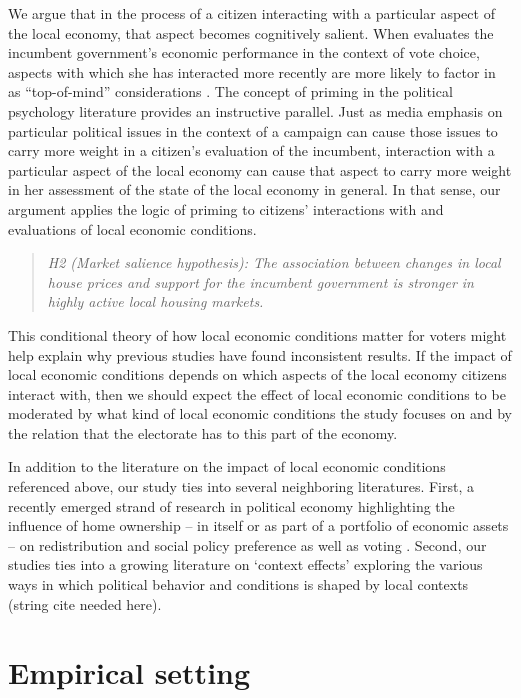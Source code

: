 \documentclass[12pt,a4paper]{article}
\begin{document}
	We argue that in the process of a citizen interacting with a particular aspect of the local economy, that aspect becomes cognitively salient. When evaluates the incumbent government’s economic performance in the context of vote choice, aspects with which she has interacted more recently are more likely to factor in as “top-of-mind” considerations \cite{zaller1992nature}. The concept of priming in the political psychology literature provides an instructive parallel. Just as media emphasis on particular political issues in the context of a campaign can cause those issues to carry more weight in a citizen’s evaluation of the incumbent, interaction with a particular aspect of the local economy can cause that aspect to carry more weight in her assessment of the state of the local economy in general. In that sense, our argument applies the logic of priming to citizens’ interactions with and evaluations of local economic conditions.
	
	\begin{quote}
	\textit{H2 (Market salience hypothesis): The association between changes in local house prices and support for the incumbent government is stronger in highly active local housing markets.}
	\end{quote}
	
	This conditional theory of how local economic conditions matter for voters might help explain why previous studies have found inconsistent results. If the impact of local economic conditions depends on which aspects of the local economy citizens interact with, then we should expect the effect of local economic conditions to be moderated by what kind of local economic conditions the study focuses on and by the relation that the electorate has to this part of the economy.
	
	In addition to the literature on the impact of local economic conditions referenced above, our study ties into several neighboring literatures. First, a recently emerged strand of research in political economy highlighting the influence of home ownership -- in itself or as part of a portfolio of economic assets -- on redistribution and social policy preference as well as voting \citep{ansell2014political,nadeau2010patrimonial,stubager2013reaching}. Second, our studies ties into a growing literature on `context effects' exploring the various ways in which political behavior and conditions is shaped by local contexts (string cite needed here). 
	
	\section{Empirical setting}
	
\end{document}

